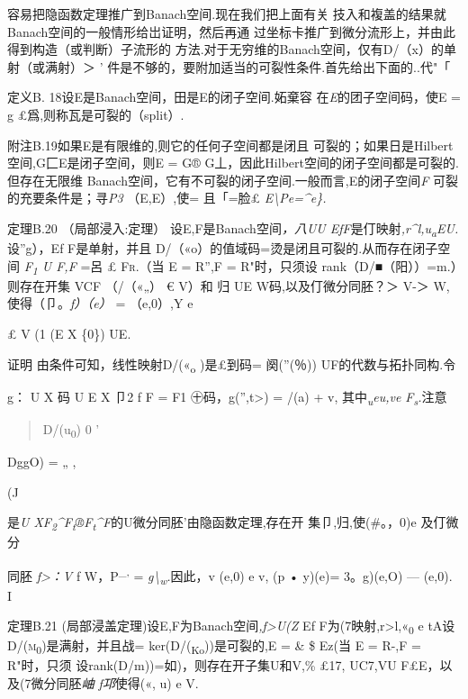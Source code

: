 容易把隐函数定理推广到Banach空间.现在我们把上面有关
技入和複盖的结果就Banach空间的一般情形给岀证明，然后再通
过坐标卡推广到微分流形上，并由此得到构造（或判断）子流形的
方法.对于无穷维的Banach空间，仅有D/（x）的单射（或满射）＞ '
件是不够的，要附加适当的可裂性条件.首先给出下面的..代"「

定义B. 18设E是Banach空间，田是E的闭子空间.妬棄容
在\emph{E}的团子空间码，使E = g £爲,则称瓦是可裂的（split）.

附注B.19如果E是有限维的,则它的任何子空间都是闭且
可裂的；如果日是Hilbert空间,G匚E是闭子空间，则E = G®
G丄，因此Hilbert空间的闭子空间都是可裂的.但存在无限维
Banach空间，它有不可裂的闭子空间.一般而言,E的闭子空间\emph{F}
可裂的充要条件是；寻\emph{P3} （E,E）,使= 且「=脸£
\emph{E\textbackslash{}Pe=\^{}e\}.}

定理B.20 （局部浸入:定理） 设E,F是Banach空间\emph{，八UU
EfF}是仃映射\emph{,r\^{}l,u\textsubscript{a}EU.}设''g），Ef
F是单射，并且 D/（«o）的值域码=烫是闭且可裂的.从而存在闭子空 间
\emph{F\textsubscript{1} U F,F} =呂 £ \textsc{Fr.}（当 E = R'',F =
R"时，只须设 rank（D/■（阳））=m.）则存在开集 VCF （/（«„） € V）和 归
UE W码,以及仃微分同胚？＞ V-＞ W,使得（卩。\emph{f）（e）} = （e,0）,Y e

£ V (1 (E X \{0\}) UE.

证明 由条件可知，线性映射D/(«\textsubscript{o} )是£到码= 阕(''(％))
UF的代数与拓扑同构.令

g： U X 码 U E X 卩2 f F = F1 ㊉码，g('',t\textgreater{}) = /(a) + v,
其中\emph{\textsubscript{u}eu,ve F\textsubscript{s}.}注意

\begin{quote}
D/(u\textsubscript{0}) 0 '
\end{quote}

DggO) = „ ,

(J

是\emph{U
XF\textsubscript{2}\^{}F\textsubscript{t}®F\textsubscript{t}\^{}F}的U微分同胚'由隐函数定理,存在开
集卩,归,使(\#。，0)e 及仃微分

同胚 \emph{f\textgreater{}：V} f W，P\textsuperscript{\_,} =
\emph{g\textbackslash{}\textsubscript{w}.}因此，v (e,0) e v, (p • y)(e)=
3。g)(e,O) --- (e,0). I

定理B.21 (局部浸盖定理)设E,F为Banach空间\emph{,f\textgreater{}U(Z} Ef
F为(7映射,r\textgreater{}l,«\textsubscript{0} e
tA设\textsc{D/(m\textsubscript{0})}是满射，并且战=
ker(D/(\textsubscript{Ko}))是可裂的,E = \& \$ Ez(当 E = R-,F =
R"时，只须 设rank(D/m))=如)，则存在开子集U和V,\% £17, UC7,VU
F£E，以及(7微分同胚\emph{岫 f邛}使得(«, u) e V.

